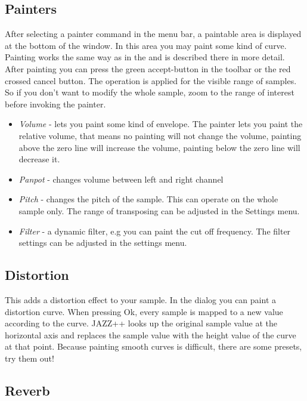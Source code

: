 \documentclass[letterpaper]{report}
\begin{document}
\subsection{Painters}\label{audiopainters}

After selecting a painter command in the menu bar, a paintable area is
displayed at the bottom of the window. In this area you may paint some
kind of curve. Painting works the same way as in the  and is described there in more detail. After
painting you can press the green accept-button in the toolbar or the red
crossed cancel button. The operation is applied for the visible range
of samples. So if you don't want to modify the whole sample, zoom to
the range of interest before invoking the painter.

\begin{itemize}
\item {\em Volume} - lets you paint some kind of envelope. The painter lets you
paint the relative volume, that means no painting will not change the
volume, painting above the zero line will increase the volume, painting
below the zero line will decrease it.
\item {\em Panpot} - changes volume between left and right channel
\item {\em Pitch} - changes the pitch of the sample. This can operate on the
whole sample only. The range of transposing can be adjusted in the
Settings menu.
\item {\em Filter} - a dynamic filter, e.g you can paint the cut off frequency.
The filter settings can be adjusted in the settings menu.
\end{itemize}



\subsection{Distortion}

This adds a distortion effect to your sample. In the dialog you can paint
a distortion curve. When pressing Ok, every sample is mapped to a new
value according to the curve. JAZZ++ looks up the original sample value at the
horizontal axis and replaces the sample value with the height value of
the curve at that point. Because painting smooth curves is difficult, there
are some presets, try them out!



\subsection{Reverb}
\end{document}
